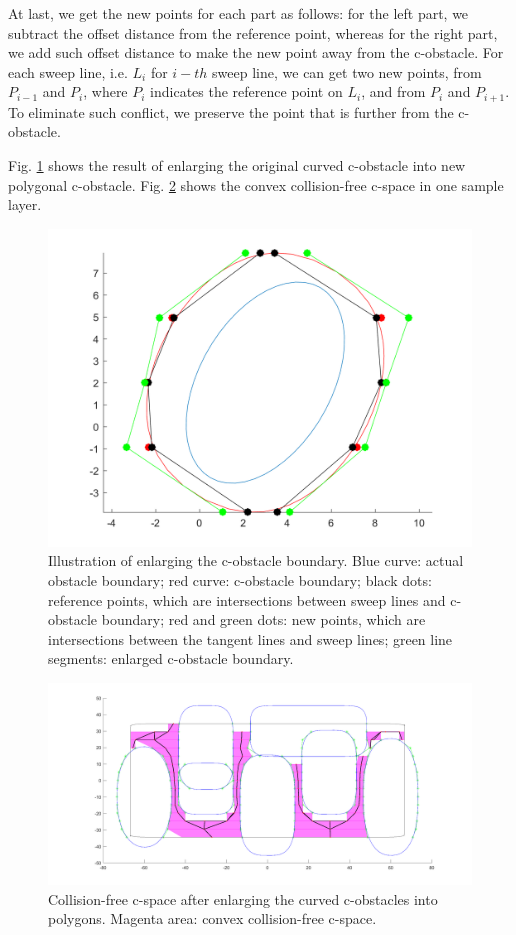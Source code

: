 \documentclass{article}
\begin{document}
\begin{enumerate}
At last, we get the new points for each part as follows: for the left part, we subtract the offset distance from the reference point, whereas for the right part, we add such offset distance to make the new point away from the c-obstacle. For each sweep line, i.e. $L_i$ for $i-th$ sweep line, we can get two new points, from $P_{i-1}$ and $P_{i}$, where $P_i$ indicates the reference point on $L_i$, and from $P_i$ and $P_{i+1}$. To eliminate such conflict, we preserve the point that is further from the c-obstacle.

Fig. \ref{BdExplode} shows the result of enlarging the original curved c-obstacle into new polygonal c-obstacle. Fig. \ref{CFArea} shows the convex collision-free c-space in one sample layer.

\begin{figure}
	\centering
	\label{BdExplode}
	\includegraphics[scale = 0.4]{BoundaryExplosion.png}
	\caption{Illustration of enlarging the c-obstacle boundary. Blue curve: actual obstacle boundary; red curve: c-obstacle boundary; black dots: reference points, which are intersections between sweep lines and c-obstacle boundary; red and green dots: new points, which are intersections between the tangent lines and sweep lines; green line segments: enlarged c-obstacle boundary.}
\end{figure}

\begin{figure}
	\centering
	\label{CFArea}
	\includegraphics[scale = 0.2]{HighwayWithFreeSpace15.png}
	\caption{Collision-free c-space after enlarging the curved c-obstacles into polygons. Magenta area: convex collision-free c-space.}
\end{figure}

\end{enumerate}
\end{document}
